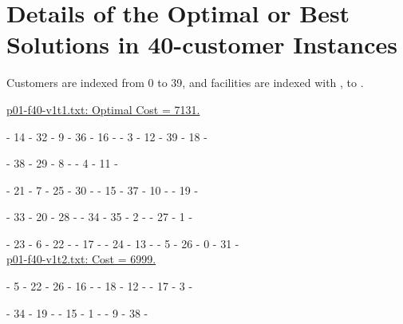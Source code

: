 \section{Details of the Optimal or Best Solutions in 40-customer Instances}
\label{app:40customerSolutions}
Customers are indexed from 0 to 39, and facilities are indexed with 
\ta, to \te.

\underline{p01-f40-v1t1.txt: Optimal Cost = 7131.}

\ta - 14 - 32 - 9 - 36 - 16 - \ta - 3 - 12 - 39 - 18 - \ta

\ta - 38 - 29 - 8 - \ta - 4 - 11 - \ta

\td - 21 - 7 - 25 - 30 - \td - 15 - 37 - 10 - \td - 19 - \td

\td - 33 - 20 - 28 - \td - 34 - 35 - 2 - \td - 27 - 1 - \td

\te - 23 - 6 - 22 - \te - 17 - \te - 24 - 13 - \te - 5 - 26 - 0 - 31 - \te
\\ 

\underline{p01-f40-v1t2.txt: Cost =  6999. }

\ta - 5 - 22 - 26 - 16 - \ta  - 18 - 12 - \ta  - 17 - 3 - \ta  

\tc- 34 - 19 - \tc - 15 - 1 - \tc - 9 - 38 - \tc 

